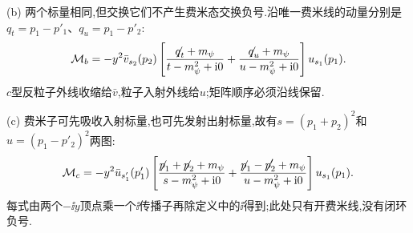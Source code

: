 \begin{solution}
(b) 两个标量相同,但交换它们不产生费米态交换负号.沿唯一费米线的动量分别是$q_t=p_1-p'_1$、$q_u=p_1-p'_2$:
\[
 \mathcal M_b=-y^2\bar v_{s_2}(p_2)
 \left[\frac{\mathord{\not\mathrel{q}}_t+m_\psi}{t-m_\psi^2+\mathrm i0}
 +\frac{\mathord{\not\mathrel{q}}_u+m_\psi}{u-m_\psi^2+\mathrm i0}\right]u_{s_1}(p_1).
\]
$c$型反粒子外线收缩给$\bar v$,粒子入射外线给$u$;矩阵顺序必须沿线保留.

(c) 费米子可先吸收入射标量,也可先发射出射标量,故有$s=(p_1+p_2)^2$和$u=(p_1-p'_2)^2$两图:
\[
 \mathcal M_c=-y^2\bar u_{s'_1}(p'_1)
 \left[\frac{\mathord{\not\mathrel{p}}_1+\mathord{\not\mathrel{p}}_2+m_\psi}{s-m_\psi^2+\mathrm i0}
 +\frac{\mathord{\not\mathrel{p}}_1-\mathord{\not\mathrel{p}}'_2+m_\psi}{u-m_\psi^2+\mathrm i0}\right]u_{s_1}(p_1).
\]
每式由两个$-\ii y$顶点乘一个$\ii$传播子再除定义中的$\ii$得到;此处只有开费米线,没有闭环负号.
\end{solution}
